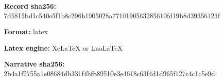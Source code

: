 \documentclass[11pt]{article}
\begin{document}
\par\noindent\textbf{Record sha256:} 7d5815bd1c54\hspace{0pt}0e5f1b8c296b\hspace{0pt}1905028a7710\hspace{0pt}190563285610\hspace{0pt}fd19b8d39356\hspace{0pt}123f

\par\noindent\textbf{Format:} latex

\par\noindent\textbf{Latex engine:} XeLaTeX or LuaLaTeX

\par\noindent\textbf{Narrative sha256:} 2b4a1f2755a1\hspace{0pt}e08684db331f\hspace{0pt}4bfb89510e3e\hspace{0pt}4618c63f4d1d\hspace{0pt}965f127c4c1c\hspace{0pt}5e9d
\end{document}
